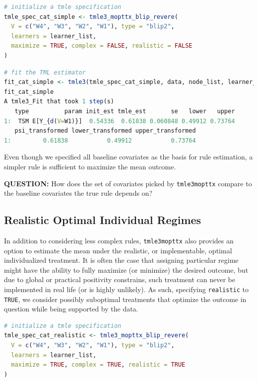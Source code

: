 \documentclass[
  12pt, krantz2,
]{krantz}
\newcommand{\passthrough}[1]{#1}
\theoremstyle{definition}
\theoremstyle{definition}
\theoremstyle{definition}
\newcommand{\1}{\mathbbm{1}}
\begin{document}
\begin{lstlisting}[language=R]
# initialize a tmle specification
tmle_spec_cat_simple <- tmle3_mopttx_blip_revere(
  V = c("W4", "W3", "W2", "W1"), type = "blip2",
  learners = learner_list,
  maximize = TRUE, complex = FALSE, realistic = FALSE
)
\end{lstlisting}

\begin{lstlisting}[language=R]
# fit the TML estimator
fit_cat_simple <- tmle3(tmle_spec_cat_simple, data, node_list, learner_list)
fit_cat_simple
A tmle3_Fit that took 1 step(s)
   type          param init_est tmle_est       se   lower   upper
1:  TSM E[Y_{d(V=W1)}]  0.54336  0.61838 0.060848 0.49912 0.73764
   psi_transformed lower_transformed upper_transformed
1:         0.61838           0.49912           0.73764
\end{lstlisting}

Even though we specified all baseline covariates as the basis
for rule estimation, a simpler rule is sufficient to maximize the mean outcome.

\textbf{QUESTION:} How does the set of covariates picked by \passthrough{\lstinline!tmle3mopttx!}
compare to the baseline covariates the true rule depends on?

\hypertarget{oit-eval-cat-v3}{%
\subsection{Realistic Optimal Individual Regimes}\label{oit-eval-cat-v3}}

In addition to considering less complex rules, \passthrough{\lstinline!tmle3mopttx!} also provides an
option to estimate the mean under the realistic, or implementable, optimal
individualized treatment. It is often the case that assigning particular regime
might have the ability to fully maximize (or minimize) the desired outcome, but
due to global or practical positivity constrains, such treatment can never be
implemented in real life (or is highly unlikely). As such, specifying
\passthrough{\lstinline!realistic!} to \passthrough{\lstinline!TRUE!}, we consider possibly suboptimal treatments that optimize
the outcome in question while being supported by the data.

\begin{lstlisting}[language=R]
# initialize a tmle specification
tmle_spec_cat_realistic <- tmle3_mopttx_blip_revere(
  V = c("W4", "W3", "W2", "W1"), type = "blip2",
  learners = learner_list,
  maximize = TRUE, complex = TRUE, realistic = TRUE
)
\end{lstlisting}
\end{document}
